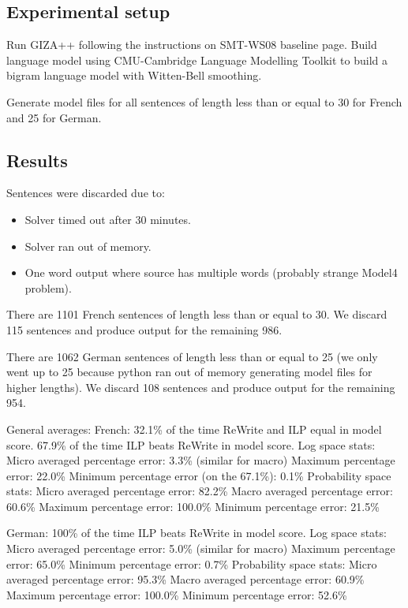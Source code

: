 
\subsection{Experimental setup}
\label{sec:experimental-setup}

Run GIZA++ following the instructions on SMT-WS08 baseline page.
Build language model using CMU-Cambridge Language Modelling Toolkit to
build a bigram language model with Witten-Bell smoothing.

Generate model files for all sentences of length less than or equal to
30 for French and 25 for German. 


\subsection{Results}
\label{sec:results-results}

Sentences were discarded due to:
\begin{itemize}
\item Solver timed out after 30 minutes.
\item Solver ran out of memory.
\item One word output where source has multiple words (probably strange Model4 problem).
\end{itemize}

There are 1101 French sentences of length less than or equal to 30.
We discard 115 sentences and produce output for the remaining 986.

There are 1062 German sentences of length less than or equal to 25 (we
only went up to 25 because python ran out of memory generating model
files for higher lengths).  We discard 108 sentences and produce
output for the remaining 954.

General averages:
French: 
32.1\% of the time ReWrite and ILP equal in model score.
67.9\% of the time ILP beats ReWrite in model score.
Log space stats:
Micro averaged percentage error: 3.3\% (similar for macro)
Maximum percentage error: 22.0\%
Minimum percentage error (on the 67.1\%):  0.1\%
Probability space stats:
Micro averaged percentage error: 82.2\%
Macro averaged percentage error: 60.6\%
Maximum percentage error: 100.0\%
Minimum percentage error: 21.5\%

German: 
100\% of the time ILP beats ReWrite in model score.
Log space stats:
Micro averaged percentage error: 5.0\% (similar for macro)
Maximum percentage error: 65.0\%
Minimum percentage error:  0.7\%
Probability space stats:
Micro averaged percentage error: 95.3\%
Macro averaged percentage error: 60.9\%
Maximum percentage error: 100.0\%
Minimum percentage error: 52.6\%

